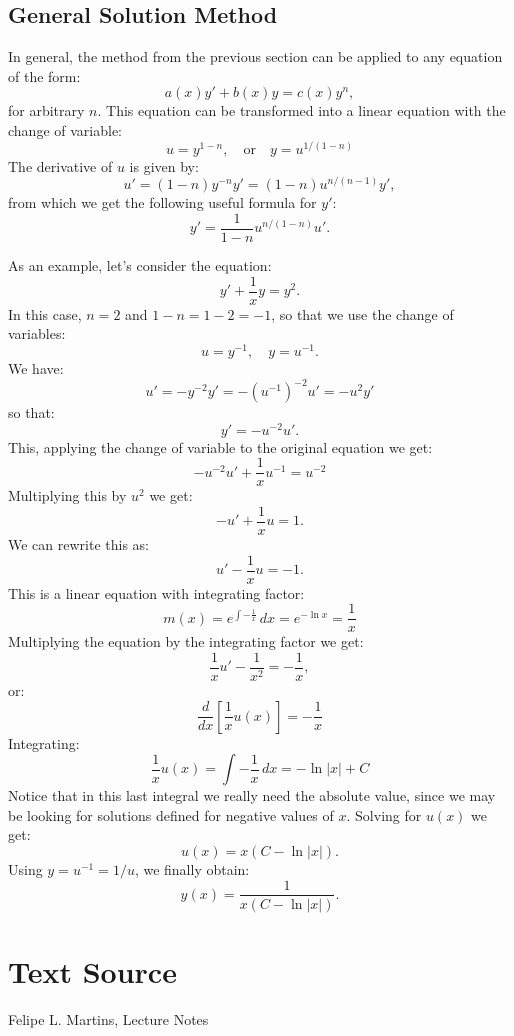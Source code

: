 \documentclass{ximera}
\begin{document}
\subsection*{General Solution Method}

In general, the method from the previous section can be applied to any equation of the form:
\[
a(x)y'+b(x)y=c(x)y^n,
\]
for arbitrary $n$. This equation can be transformed into a linear equation with the change of variable:
\[
u=y^{1-n},\quad\text{or}\quad y=u^{1/(1-n)}
\]
The derivative of $u$ is given by:
\[
u'=(1-n)y^{-n}y'=(1-n)u^{n/(n-1)}y',
\]
from which we get the following useful formula for $y'$:
\[
y'=\frac{1}{1-n}u^{n/(1-n)}u'.
\]

\begin{example}\label{ex:bernoulli1}
As an example, let's consider the equation:
\[
y'+\frac{1}{x}y=y^2.
\]
In this case, $n=2$ and $1-n=1-2=-1$, so that we use the change of variables:
\[
u=y^{-1},\quad y=u^{-1}.
\]
We have:
\[
u'=-y^{-2}y'=-(u^{-1})^{-2}u'=-u^2y'
\]
so that:
\[
y'=-u^{-2}u'.
\]
This, applying the change of variable to the original equation we get:
\[
-u^{-2}u'+\frac{1}{x}u^{-1}=u^{-2}
\]
Multiplying this by $u^2$ we get:
\[
-u'+\frac{1}{x}u=1.
\]
We can rewrite this as:
\[
u'-\frac{1}{x}u=-1.
\]
This is a linear equation with integrating factor:
\[
m(x)=e^{\int -\frac{1}{x}}\,dx=e^{-\ln x}=\frac{1}{x}
\]
Multiplying the equation by the integrating factor we get:
\[
\frac{1}{x}u'-\frac{1}{x^2}=-\frac{1}{x},
\]
or:
\[
\frac{d}{dx}\left[\frac{1}{x}u(x)\right]=-\frac{1}{x}
\]
Integrating:
\[
\frac{1}{x}u(x)=\int -\frac{1}{x}\,dx=-\ln |x| +C
\]
Notice that in this last integral we really need the absolute value, since we may be looking for solutions defined for negative values of $x$. Solving for $u(x)$ we get:
\[
u(x)=x(C-\ln|x|).
\]
Using $y=u^{-1}=1/u$, we finally obtain:
\[
y(x)=\frac{1}{x(C-\ln|x|)}.
\]
\end{example}


\section*{Text Source}
Felipe L. Martins, Lecture Notes
\end{document}
